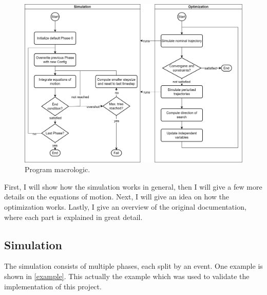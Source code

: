 \begin{figure}[!ht]
  \centering
  \includegraphics[width=\textwidth]{images/macrologic.png}
  \caption{Program macrologic.}
  \label{macrologic}
\end{figure}

First, I will show how the simulation works in general, then I will give a few
more details on the equations of motion. Next, I will give an idea on how the
optimization works. Lastly, I give an overview of the original documentation,
where each part is explained in great detail.

\subsection{Simulation}\label{simulation}

The simulation consists of multiple phases, each split by an event. One
example is shown in \cref{example}. This actually the example which was used to validate the
implementation of this project.

